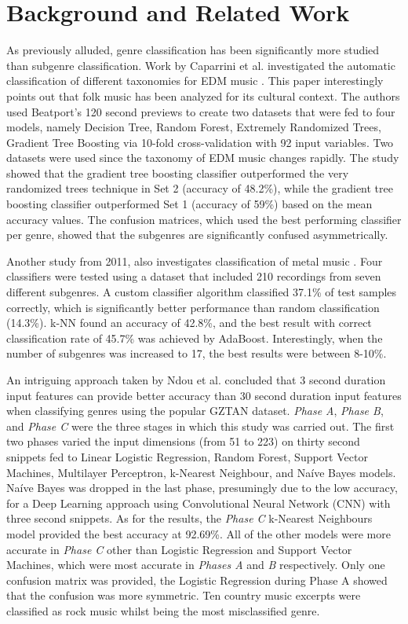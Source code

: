 \section{Background and Related Work}
As previously alluded, genre classification has been significantly more studied than subgenre classification. Work by Caparrini et al. investigated the automatic classification of different taxonomies for EDM music \cite{doi:10.1080/09298215.2020.1761399}. This paper interestingly points out that folk music has been analyzed for its cultural context. The authors used Beatport's 120 second previews to create two datasets that were fed to four models, namely Decision Tree, Random Forest, Extremely Randomized Trees, Gradient Tree Boosting via 10-fold cross-validation with 92 input variables. Two datasets were used since the taxonomy of EDM music changes rapidly. The study showed that the gradient tree boosting classifier outperformed the very randomized trees technique in Set 2 (accuracy of 48.2\%), while the gradient tree boosting classifier outperformed Set 1 (accuracy of 59\%) based on the mean accuracy values. The confusion matrices, which used the best performing classifier per genre, showed that the subgenres are significantly confused asymmetrically.

Another study from 2011, also investigates classification of metal music \cite{tsatsishvili2011automatic}. Four classifiers were tested using a dataset that included 210 recordings from seven different subgenres. A custom classifier algorithm classified 37.1\% of test samples correctly, which is significantly better performance than random classification (14.3\%). k-NN found an accuracy of 42.8\%, and the best result with correct classification rate of 45.7\% was achieved by
AdaBoost. Interestingly, when the number of subgenres was increased to 17, the best results were between 8-10\%.

An intriguing approach taken by Ndou et al. concluded that 3 second duration input features can provide better accuracy than 30 second duration input features \cite{ndou2021music} when classifying genres using the popular GZTAN dataset. \textit{Phase A}, \textit{Phase B}, and \textit{Phase C} were the three stages in which this study was carried out. The first two phases varied the input dimensions (from 51 to 223) on thirty second snippets fed to Linear Logistic Regression, Random Forest, Support Vector Machines, Multilayer Perceptron, k-Nearest Neighbour, and Naíve Bayes models. Naíve Bayes was dropped in the last phase, presumingly due to the low accuracy, for a Deep Learning approach using Convolutional Neural Network (CNN) with three second snippets. As for the results, the \textit{Phase C} k-Nearest Neighbours model provided the best accuracy at 92.69\%. All of the other models were more accurate in \textit{Phase C} other than Logistic Regression and Support Vector Machines, which were most accurate in \textit{Phases A} and \textit{B} respectively. Only one confusion matrix was provided, the Logistic Regression during Phase A showed that the confusion was more symmetric. Ten country music excerpts were classified as rock music whilst being the most misclassified genre.

